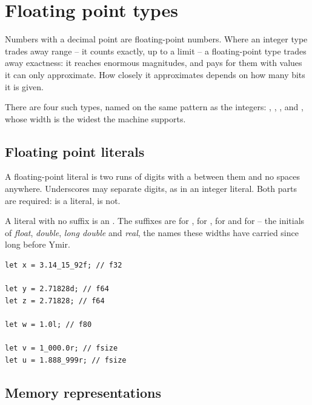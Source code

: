 \vfill%
\pagebreak
\section{Floating point types}
\label{sec:types:floats}

Numbers with a decimal point are floating-point numbers. Where an integer type
trades away range -- it counts exactly, up to a limit -- a floating-point type
trades away exactness: it reaches enormous magnitudes, and pays for them with
values it can only approximate. How closely it approximates depends on how many
bits it is given.

There are four such types, named on the same pattern as the integers:
, , , and , whose width is the
widest the machine supports.

\subsection{Floating point literals}

A floating-point literal is two runs of digits with a  between them and
no spaces anywhere. Underscores may separate digits, as in an integer literal.
Both parts are required:  is a literal,  is not.

A literal with no suffix is an . The suffixes are  for
,  for ,  for  and 
for  -- the initials of \textit{float}, \textit{double},
\textit{long double} and \textit{real}, the names these widths have carried
since long before Ymir.

\begin{lstlisting}[style=coloredverbatim, label=lst:types:float_literal, caption=Example of floating point literals]
let x = 3.14_15_92f; // f32

let y = 2.71828d; // f64
let z = 2.71828; // f64

let w = 1.0l; // f80

let v = 1_000.0r; // fsize
let u = 1.888_999r; // fsize
\end{lstlisting}


\subsection{Memory representations}

